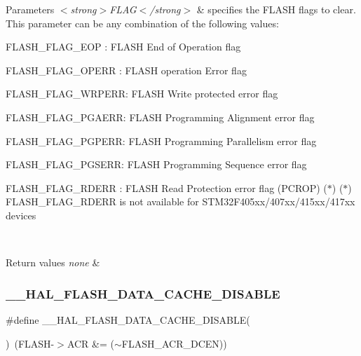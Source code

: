 \begin{DoxyParams}{Parameters}
{\em $<$strong$>$\+F\+L\+A\+G$<$/strong$>$} & specifies the F\+L\+A\+SH flags to clear. This parameter can be any combination of the following values\+: \begin{DoxyItemize}
\item F\+L\+A\+S\+H\+\_\+\+F\+L\+A\+G\+\_\+\+E\+OP \+: F\+L\+A\+SH End of Operation flag \item F\+L\+A\+S\+H\+\_\+\+F\+L\+A\+G\+\_\+\+O\+P\+E\+RR \+: F\+L\+A\+SH operation Error flag \item F\+L\+A\+S\+H\+\_\+\+F\+L\+A\+G\+\_\+\+W\+R\+P\+E\+RR\+: F\+L\+A\+SH Write protected error flag \item F\+L\+A\+S\+H\+\_\+\+F\+L\+A\+G\+\_\+\+P\+G\+A\+E\+RR\+: F\+L\+A\+SH Programming Alignment error flag \item F\+L\+A\+S\+H\+\_\+\+F\+L\+A\+G\+\_\+\+P\+G\+P\+E\+RR\+: F\+L\+A\+SH Programming Parallelism error flag \item F\+L\+A\+S\+H\+\_\+\+F\+L\+A\+G\+\_\+\+P\+G\+S\+E\+RR\+: F\+L\+A\+SH Programming Sequence error flag \item F\+L\+A\+S\+H\+\_\+\+F\+L\+A\+G\+\_\+\+R\+D\+E\+RR \+: F\+L\+A\+SH Read Protection error flag (P\+C\+R\+OP) ($\ast$) ($\ast$) F\+L\+A\+S\+H\+\_\+\+F\+L\+A\+G\+\_\+\+R\+D\+E\+RR is not available for S\+T\+M32\+F405xx/407xx/415xx/417xx devices \end{DoxyItemize}
\\
\hline
\end{DoxyParams}

\begin{DoxyRetVals}{Return values}
{\em none} & \\
\hline
\end{DoxyRetVals}
\mbox{\label{group___f_l_a_s_h___exported___macros_ga247f85a1fcc780be21f9fc2f1d29ee7e}} 
\subsubsection{\texorpdfstring{\+\_\+\+\_\+\+H\+A\+L\+\_\+\+F\+L\+A\+S\+H\+\_\+\+D\+A\+T\+A\+\_\+\+C\+A\+C\+H\+E\+\_\+\+D\+I\+S\+A\+B\+LE}{\_\_HAL\_FLASH\_DATA\_CACHE\_DISABLE}}
{\footnotesize\ttfamily \#define \+\_\+\+\_\+\+H\+A\+L\+\_\+\+F\+L\+A\+S\+H\+\_\+\+D\+A\+T\+A\+\_\+\+C\+A\+C\+H\+E\+\_\+\+D\+I\+S\+A\+B\+LE(\begin{DoxyParamCaption}{ }\end{DoxyParamCaption})~(F\+L\+A\+SH-\/$>$A\+CR \&= ($\sim$F\+L\+A\+S\+H\+\_\+\+A\+C\+R\+\_\+\+D\+C\+EN))}



